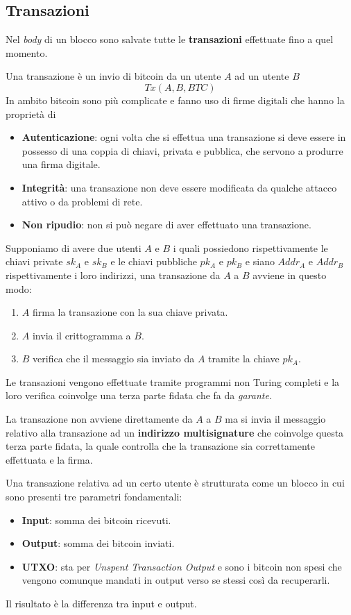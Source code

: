 \subsection{Transazioni}
Nel \emph{body} di un blocco sono salvate tutte le \textbf{transazioni} effettuate fino a quel momento.

Una transazione
\`e un invio di bitcoin da un utente $A$ ad un utente $B$
\[ Tx(A, B, BTC) \]
In ambito bitcoin sono pi\`u complicate e fanno uso di firme digitali che hanno la propriet\`a di
\begin{itemize}
	\item \textbf{Autenticazione}: ogni volta che si effettua una transazione si deve essere in possesso di una coppia
	      di chiavi, privata e pubblica, che servono a produrre una firma digitale.
	\item \textbf{Integrit\`a}: una transazione non deve essere modificata da qualche attacco attivo o da problemi di
	      rete.
	\item \textbf{Non ripudio}: non si pu\`o negare di aver effettuato una transazione.
\end{itemize}
Supponiamo di avere due utenti $A$ e $B$ i quali possiedono rispettivamente le chiavi private $sk_A$ e $sk_B$ e le
chiavi pubbliche $pk_A$ e $pk_B$ e siano $Addr_A$ e $Addr_B$ rispettivamente i loro indirizzi, una transazione da $A$
a $B$ avviene in questo modo:
\begin{enumerate}
	\item $A$ firma la transazione con la sua chiave privata.
	\item $A$ invia il crittogramma a $B$.
	\item $B$ verifica che il messaggio sia inviato da $A$ tramite la chiave $pk_A$.
\end{enumerate}
Le transazioni vengono effettuate tramite programmi non Turing completi e la loro verifica coinvolge una terza parte
fidata che fa da \emph{garante}.

La transazione non avviene direttamente da $A$ a $B$ ma si invia il messaggio relativo alla transazione ad un
\textbf{indirizzo multisignature} che coinvolge questa terza parte fidata, la quale controlla che la transazione
sia correttamente effettuata e la firma.

Una transazione relativa ad un certo utente \`e strutturata come un blocco in cui sono presenti tre parametri
fondamentali:
\begin{itemize}
	\item \textbf{Input}: somma dei bitcoin ricevuti.
	\item \textbf{Output}: somma dei bitcoin inviati.
	\item \textbf{UTXO}: sta per \emph{Unspent Transaction Output} e sono i bitcoin non spesi che vengono comunque
	      mandati in output verso se stessi cos\`i da recuperarli.
\end{itemize}
Il risultato \`e la differenza tra input e output.


